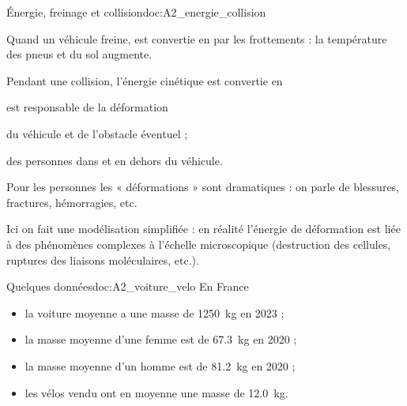 \begin{doc}{Énergie, freinage et collision}{doc:A2_energie_collision}
  \begin{encart}
    Quand un véhicule freine,  est convertie en  par les frottements : la température des pneus et du sol augmente.
  
    Pendant une collision, l'énergie cinétique est convertie en 
  \end{encart}
  \begin{center}
  \end{center}
  
   est responsable de la déformation
  \begin{listePoints}
    \item du véhicule et de l'obstacle éventuel ;
    \item des personnes dans et en dehors du véhicule.
  \end{listePoints}
  Pour les personnes les « déformations » sont dramatiques : on parle de blessures, fractures, hémorragies, etc.

  \attention Ici on fait une modélisation simplifiée : en réalité l'énergie de déformation est liée à des phénomènes complexes à l'échelle microscopique (destruction des cellules, ruptures des liaisons moléculaires, etc.).
\end{doc}

\begin{doc}{Quelques données}{doc:A2_voiture_velo}
  En France 
  \begin{itemize}
      \item la voiture moyenne a une masse de \qty{1 250}{\kg} en 2023 ;
      \item la masse moyenne d'une femme est de \qty{67,3}{\kg} en 2020 ;
      \item la masse moyenne d'un homme est de \qty{81,2}{\kg} en 2020 ;
      \item les vélos vendu ont en moyenne une masse de \qty{12,0}{\kg}.
  \end{itemize}
\end{doc}



